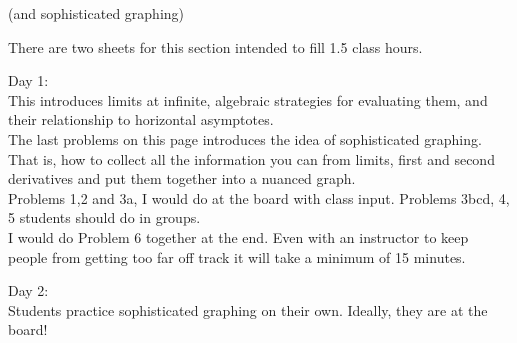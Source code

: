 \documentclass[11pt,fleqn]{article}
\begin{document}
\setlength{\parindent}{0cm}
\renewcommand{\headrulewidth}{0pt}
\newcommand{\blank}[1]{\rule{#1}{0.75pt}}
\renewcommand{\d}{\displaystyle}
\vspace*{-0.7in}
\begin{center}
 {\large{ }}
 (and sophisticated graphing)
\end{center}

There are two sheets for this section intended to fill 1.5 class hours. \\

\vfill

Day 1:\\
This introduces limits at infinite, algebraic strategies for evaluating them, and their relationship to horizontal asymptotes. \\
The last problems on this page introduces the idea of sophisticated graphing. That is, how to collect all the information you can from limits, first and second derivatives and put them together into a nuanced graph. \\

Problems 1,2 and 3a, I would do at the board with class input. Problems 3bcd, 4, 5 students should do in groups.\\

I would do Problem 6 together at the end. Even with an instructor to keep people from getting too far off track it will take a minimum of 15 minutes.\\

\vfill

Day 2:\\

Students practice sophisticated graphing on their own. Ideally, they are at the board!

\vfill
 
\end{document}
